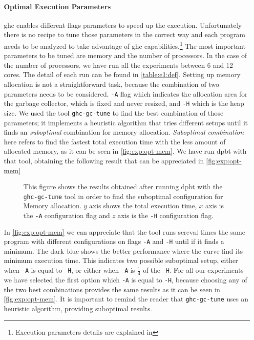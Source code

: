 \paragraph{Optimal Execution Parameters}\label{par:ex:param} \acrshort{ghc} enables different flags parameters to speed up the execution. Unfortunately there is no recipe to tune those parameters in the correct way and each program needs to be analyzed to take advantage of \acrshort{ghc} capabilities.\footnote{Execution parameters details are explained in }
The most important parameters to be tuned are memory and the number of processors. In the case of the number of processors, we have run all the experiments between 6 and 12 cores. The detail of each run can be found in \autoref{table:e1:def}.
Setting up memory allocation is not a straightforward task, because the combination of two parameters needs to be considered. \texttt{-A} flag which indicates the allocation area for the garbage collector, which is fixed and never resized, and \texttt{-H} which is the heap size. 
We used the tool \texttt{ghc-gc-tune} \cite{ghctune} to find the best combination of those parameters; 
it implements a heuristic algorithm that tries different setups until it finds an \emph{suboptimal} combination for memory allocation. \emph{Suboptimal combination} here refers to find the fastest total execution time with the less amount of allocated memory, as it can be seen in \autoref{fig:exp:opt-mem}.
We have run \acrshort{dpbt} with that tool, obtaining the following result that can be appreciated in \autoref{fig:exp:opt-mem}

\begin{figure}[h!]
  \centering  
\caption[{[EE] $\dpbt$ Finding Optimal Memory Setup}]{This figure shows the results obtained after running \acrshort{dpbt} with the \texttt{ghc-gc-tune} tool in order to find the suboptimal configuration for Memory allocation. $y$ axis shows the total execution time, $x$ axis is the \texttt{-A} configuration flag and $z$ axis is the \texttt{-H} configuration flag.}
\label{fig:exp:opt-mem}
\end{figure}

In \autoref{fig:exp:opt-mem} we can appreciate that the tool runs sereval times the same program with different configurations on flags \texttt{-A} and \texttt{-H} until if it finds a minimum. The dark blue shows the better performance where the curve find its minimum execution time. 
This indicates two possible suboptimal setup, either when \texttt{-A} is equal to \texttt{-H}, or either when \texttt{-A} is $\frac{1}{4}$ of the \texttt{-H}. For all our experiments we have selected the first option which \texttt{-A} is equal to \texttt{-H}, because choosing any of the two best combinations provides the same results as it can be seen in \autoref{fig:exp:opt-mem}.
It is important to remind the reader that \texttt{ghc-gc-tune} \cite{ghctune} uses an heuristic algorithm, providing suboptimal results.

